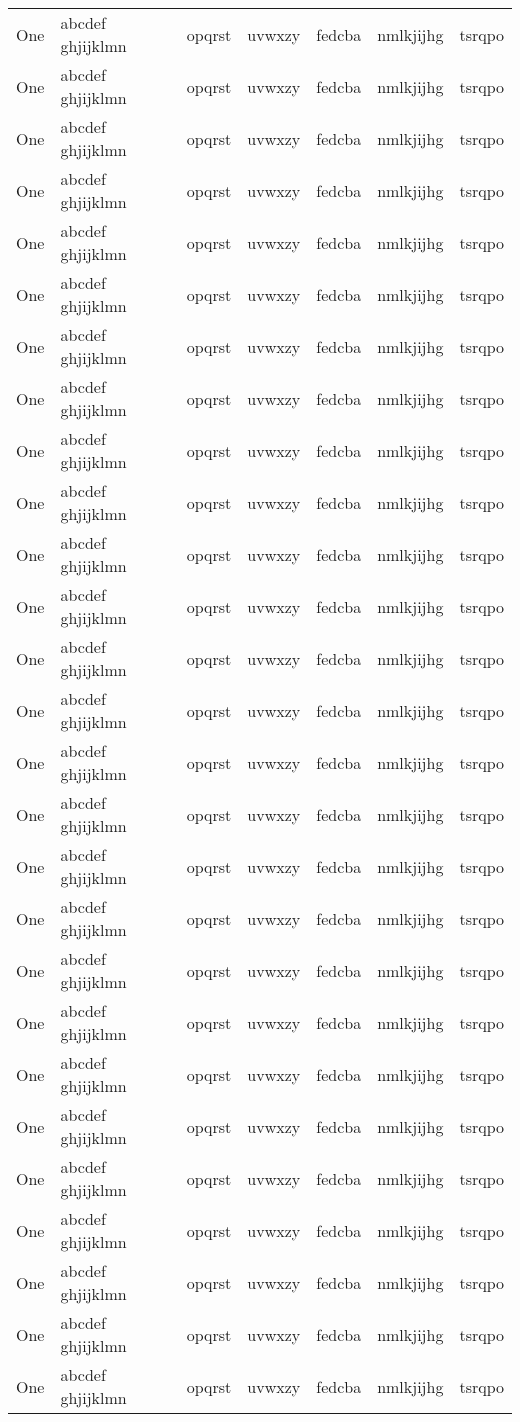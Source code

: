 \begin{center}
\begin{longtable}{|l|l|l|l|l|l|l|}
		One & abcdef ghjijklmn & opqrst & uvwxzy & fedcba & nmlkjijhg & tsrqpo \\
		One & abcdef ghjijklmn & opqrst & uvwxzy & fedcba & nmlkjijhg & tsrqpo \\
		One & abcdef ghjijklmn & opqrst & uvwxzy & fedcba & nmlkjijhg & tsrqpo \\
		One & abcdef ghjijklmn & opqrst & uvwxzy & fedcba & nmlkjijhg & tsrqpo \\
		One & abcdef ghjijklmn & opqrst & uvwxzy & fedcba & nmlkjijhg & tsrqpo \\
		One & abcdef ghjijklmn & opqrst & uvwxzy & fedcba & nmlkjijhg & tsrqpo \\
		One & abcdef ghjijklmn & opqrst & uvwxzy & fedcba & nmlkjijhg & tsrqpo \\
		One & abcdef ghjijklmn & opqrst & uvwxzy & fedcba & nmlkjijhg & tsrqpo \\
		One & abcdef ghjijklmn & opqrst & uvwxzy & fedcba & nmlkjijhg & tsrqpo \\
		One & abcdef ghjijklmn & opqrst & uvwxzy & fedcba & nmlkjijhg & tsrqpo \\
		One & abcdef ghjijklmn & opqrst & uvwxzy & fedcba & nmlkjijhg & tsrqpo \\
		One & abcdef ghjijklmn & opqrst & uvwxzy & fedcba & nmlkjijhg & tsrqpo \\
		One & abcdef ghjijklmn & opqrst & uvwxzy & fedcba & nmlkjijhg & tsrqpo \\
		One & abcdef ghjijklmn & opqrst & uvwxzy & fedcba & nmlkjijhg & tsrqpo \\
		One & abcdef ghjijklmn & opqrst & uvwxzy & fedcba & nmlkjijhg & tsrqpo \\
		One & abcdef ghjijklmn & opqrst & uvwxzy & fedcba & nmlkjijhg & tsrqpo \\
		One & abcdef ghjijklmn & opqrst & uvwxzy & fedcba & nmlkjijhg & tsrqpo \\
		One & abcdef ghjijklmn & opqrst & uvwxzy & fedcba & nmlkjijhg & tsrqpo \\
		One & abcdef ghjijklmn & opqrst & uvwxzy & fedcba & nmlkjijhg & tsrqpo \\
		One & abcdef ghjijklmn & opqrst & uvwxzy & fedcba & nmlkjijhg & tsrqpo \\
		One & abcdef ghjijklmn & opqrst & uvwxzy & fedcba & nmlkjijhg & tsrqpo \\
		One & abcdef ghjijklmn & opqrst & uvwxzy & fedcba & nmlkjijhg & tsrqpo \\
		One & abcdef ghjijklmn & opqrst & uvwxzy & fedcba & nmlkjijhg & tsrqpo \\
		One & abcdef ghjijklmn & opqrst & uvwxzy & fedcba & nmlkjijhg & tsrqpo \\
		One & abcdef ghjijklmn & opqrst & uvwxzy & fedcba & nmlkjijhg & tsrqpo \\
		One & abcdef ghjijklmn & opqrst & uvwxzy & fedcba & nmlkjijhg & tsrqpo \\
		One & abcdef ghjijklmn & opqrst & uvwxzy & fedcba & nmlkjijhg & tsrqpo \\
	
	\end{longtable}
\end{center}

